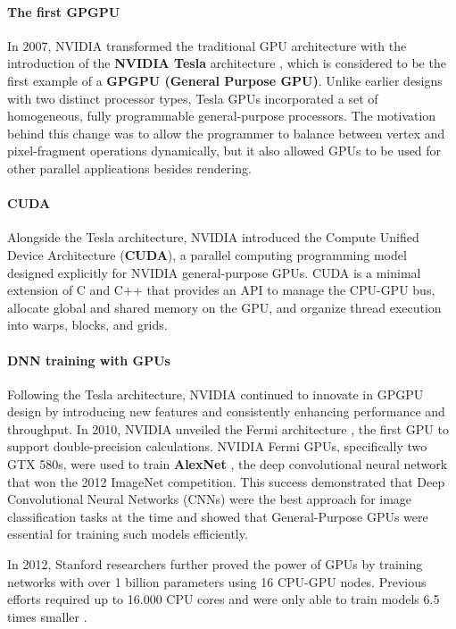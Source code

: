 \documentclass[conference]{IEEEtran}
\begin{document}
\paragraph{The first GPGPU}
In 2007, NVIDIA transformed the traditional GPU architecture with the introduction of the \textbf{NVIDIA Tesla} architecture \cite{lindholm2008nvidia}, which is considered to be the first example of a \textbf{GPGPU (General Purpose GPU)}. Unlike earlier designs with two distinct processor types, Tesla GPUs incorporated a set of homogeneous, fully programmable general-purpose processors. The motivation behind this change was to allow the programmer to balance between vertex and pixel-fragment operations dynamically, but it also allowed GPUs to be used for other parallel applications besides rendering. 

\paragraph{CUDA}
Alongside the Tesla architecture, NVIDIA introduced the Compute Unified Device Architecture (\textbf{CUDA}), a parallel computing programming model designed explicitly for NVIDIA general-purpose GPUs. CUDA is a minimal extension of C and C++ that provides an API to manage the CPU-GPU bus, allocate global and shared memory on the GPU, and organize thread execution into warps, blocks, and grids.

\paragraph{DNN training with GPUs}

Following the Tesla architecture, NVIDIA continued to innovate in GPGPU design by introducing new features and consistently enhancing performance and throughput. In 2010, NVIDIA unveiled the Fermi architecture \cite{wittenbrink2011fermi}, the first GPU to support double-precision calculations. NVIDIA Fermi GPUs, specifically two GTX 580s, were used to train \textbf{AlexNet} \cite{NIPS2012_c399862d}, the deep convolutional neural network that won the 2012 ImageNet competition. This success demonstrated that Deep Convolutional Neural Networks (CNNs) were the best approach for image classification tasks at the time and showed that General-Purpose GPUs were essential for training such models efficiently.

In 2012, Stanford researchers further proved the power of GPUs by training networks with over 1 billion parameters using 16 CPU-GPU nodes. Previous efforts required up to 16.000 CPU cores and were only able to train models 6.5 times smaller \cite{Coates2013}.
\end{document}
